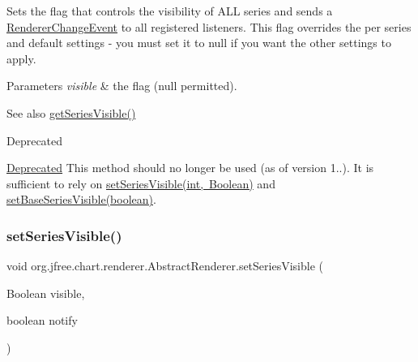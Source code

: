 Sets the flag that controls the visibility of A\+LL series and sends a \mbox{\hyperlink{}{Renderer\+Change\+Event}} to all registered listeners. This flag overrides the per series and default settings -\/ you must set it to {\ttfamily null} if you want the other settings to apply.


\begin{DoxyParams}{Parameters}
{\em visible} & the flag ({\ttfamily null} permitted).\\
\hline
\end{DoxyParams}
\begin{DoxySeeAlso}{See also}
\mbox{\hyperlink{classorg_1_1jfree_1_1chart_1_1renderer_1_1_abstract_renderer_a2779761677dd1fc3387fde96068b0b85}{get\+Series\+Visible()}}
\end{DoxySeeAlso}
\begin{DoxyRefDesc}{Deprecated}
\item[\mbox{\hyperlink{deprecated__deprecated000111}{Deprecated}}]This method should no longer be used (as of version 1..). It is sufficient to rely on \mbox{\hyperlink{classorg_1_1jfree_1_1chart_1_1renderer_1_1_abstract_renderer_a4311b798698e141c2fb2deb6a412283f}{set\+Series\+Visible(int, Boolean)}} and \mbox{\hyperlink{classorg_1_1jfree_1_1chart_1_1renderer_1_1_abstract_renderer_af5e2fb8863761c1e74ff957a7c13ba78}{set\+Base\+Series\+Visible(boolean)}}. \end{DoxyRefDesc}
\mbox{\label{classorg_1_1jfree_1_1chart_1_1renderer_1_1_abstract_renderer_afddfe439a293eb3b540ea13be1839fea}} 
\subsubsection{\texorpdfstring{set\+Series\+Visible()}{setSeriesVisible()}\hspace{0.1cm}{\footnotesize\ttfamily [4/4]}}
{\footnotesize\ttfamily void org.\+jfree.\+chart.\+renderer.\+Abstract\+Renderer.\+set\+Series\+Visible (\begin{DoxyParamCaption}\item[{Boolean}]{visible,  }\item[{boolean}]{notify }\end{DoxyParamCaption})}

